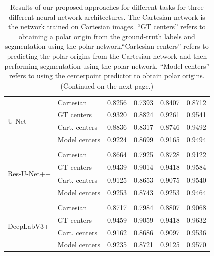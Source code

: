 \begin{table}
\begin{tabularx}{\textwidth}{X X c c c c}
 \multirow{4}{7em}{{U-Net}}
& Cartesian & 0.8256 & 0.7393 & 0.8407 & 0.8712 \\
& GT centers & 0.9320 & 0.8824 & 0.9261 & 0.9541 \\
& Cart. centers & 0.8836 & 0.8317 & 0.8746 & 0.9492 \\
& Model centers & 0.9224 & 0.8699 & 0.9165 & 0.9494 \\ [1ex]
\hline \\ [-1.5ex]

 \multirow{4}{7em}{{Res-U-Net++}}
& Cartesian & 0.8664 & 0.7925 & 0.8728 & 0.9122 \\
& GT centers & 0.9439 & 0.9014 & 0.9418 & 0.9584 \\
& Cart. centers & 0.9125 & 0.8653 & 0.9075 & 0.9540 \\
& Model centers & 0.9253 & 0.8743 & 0.9253 & 0.9464 \\ [1ex]
\hline \\ [-1.5ex]

 \multirow{4}{7em}{{DeepLabV3+}}
& Cartesian & 0.8717 & 0.7984 & 0.8807 & 0.9068 \\
& GT centers & 0.9459 & 0.9059 & 0.9418 & 0.9632 \\
& Cart. centers & 0.9162 & 0.8686 & 0.9097 & 0.9536 \\
& Model centers & 0.9235 & 0.8721 & 0.9125 & 0.9570 \\ [1ex]
\end{tabularx}
\caption{Results of our proposed approaches for different tasks 
for three different neural network architectures. The Cartesian network is the network trained on Cartesian images. ``GT centers'' refers to obtaining a polar origin from the ground-truth labels and segmentation using the polar network.``Cartesian centers'' refers to predicting the polar origins from the Cartesian network and then performing segmentation using the polar network. ``Model centers'' refers to using the centerpoint predictor to obtain polar origins. (Continued on the next page.)}
\label{table:results}
\end{table}

